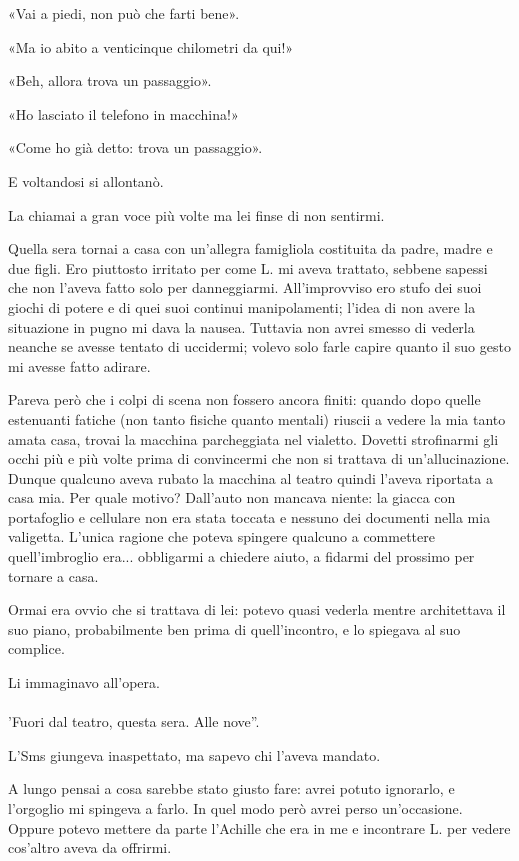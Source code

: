 \documentclass[a4paper,12pt]{book}
\begin{document}
«Vai a piedi, non può che farti bene».

«Ma io abito a venticinque chilometri da qui!»

«Beh, allora trova un passaggio».

«Ho lasciato il telefono in macchina!»

«Come ho già detto: trova un passaggio».

E voltandosi si allontanò.

La chiamai a gran voce più volte ma lei finse di non sentirmi.

Quella sera tornai a casa con un'allegra famigliola costituita da padre, madre
e due figli. Ero piuttosto irritato per come L. mi aveva trattato, sebbene
sapessi che non l'aveva fatto solo per danneggiarmi. All'improvviso ero
stufo dei suoi giochi di potere e di quei suoi continui manipolamenti; l'idea
di non avere la situazione in pugno mi dava la nausea. Tuttavia non avrei
smesso di vederla neanche se avesse tentato di uccidermi; volevo solo farle
capire quanto il suo gesto mi avesse fatto adirare.

Pareva però che i colpi di scena non fossero ancora finiti: quando dopo quelle
estenuanti fatiche (non tanto fisiche quanto mentali) riuscii a vedere la mia
tanto amata casa, trovai la macchina parcheggiata nel vialetto. Dovetti
strofinarmi gli occhi più e più volte prima di convincermi che non si trattava
di un'allucinazione. Dunque qualcuno aveva rubato la macchina al teatro
quindi l'aveva riportata a casa mia. Per quale motivo? Dall'auto non mancava
niente: la giacca con portafoglio e cellulare non era stata toccata e nessuno
dei documenti nella mia valigetta. L'unica ragione che poteva spingere
qualcuno a commettere quell'imbroglio era... obbligarmi a chiedere aiuto, a
fidarmi del prossimo per tornare a casa.

Ormai era ovvio che si trattava di lei: potevo quasi vederla mentre architettava
il suo piano, probabilmente ben prima di quell'incontro, e lo spiegava al suo
complice.

Li immaginavo all'opera.

\paragraph{}
'Fuori dal teatro, questa sera. Alle nove''.

L'Sms giungeva inaspettato, ma sapevo chi l'aveva mandato.

A lungo pensai a cosa sarebbe stato giusto fare: avrei potuto ignorarlo, e
l'orgoglio mi spingeva a farlo. In quel modo però avrei perso
un'occasione. Oppure potevo mettere da parte l'Achille che era in me e
incontrare L. per vedere cos'altro aveva da offrirmi.
\end{document}
